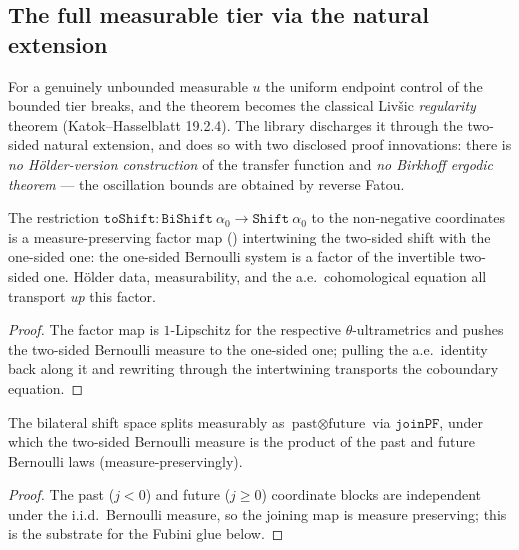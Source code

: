 \subsection{The full measurable tier via the natural extension}

For a genuinely unbounded measurable \(u\) the uniform endpoint control of the bounded tier breaks,
and the theorem becomes the classical Livšic \emph{regularity} theorem (Katok--Hasselblatt 19.2.4).
The library discharges it through the two-sided natural extension, and does so with two disclosed
proof innovations: there is \emph{no Hölder-version construction} of the transfer function and
\emph{no Birkhoff ergodic theorem} --- the oscillation bounds are obtained by reverse Fatou.

\begin{lemma}\label{lem:livsic-toshift}
  \leanok
  The restriction \(\texttt{toShift}:\texttt{BiShift}\ \alpha_0\to\texttt{Shift}\ \alpha_0\) to the
  non-negative coordinates is a measure-preserving factor map
  () intertwining the two-sided shift with the
  one-sided one: the one-sided Bernoulli system is a factor of the invertible two-sided one. Hölder
  data, measurability, and the a.e.\ cohomological equation all transport \emph{up} this factor.
\end{lemma}
\begin{proof}\leanok
  The factor map is \(1\)-Lipschitz for the respective \(\theta\)-ultrametrics and pushes the
  two-sided Bernoulli measure to the one-sided one; pulling the a.e.\ identity back along it and
  rewriting through the intertwining transports the coboundary equation.
\end{proof}

\begin{lemma}\label{lem:livsic-joinpf}
  \leanok
  The bilateral shift space splits measurably as \(\text{past}\otimes\text{future}\) via
  \(\texttt{joinPF}\), under which the two-sided Bernoulli measure is the product of the past and
  future Bernoulli laws (measure-preservingly).
\end{lemma}
\begin{proof}\leanok
  The past (\(j<0\)) and future (\(j\ge 0\)) coordinate blocks are independent under the i.i.d.\
  Bernoulli measure, so the joining map is measure preserving; this is the substrate for the Fubini
  glue below.
\end{proof}

